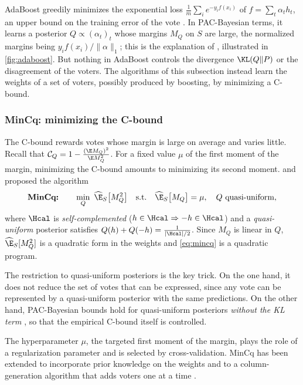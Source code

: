 AdaBoost greedily minimizes the exponential loss $\frac1m\sum_ie^{-y_if(x_i)}$
of $f=\sum_t\alpha_th_t$, an upper bound on the training error of the vote
\citep{freund1997decision}. In PAC-Bayesian terms, it learns a posterior
$Q\propto(\alpha_t)_t$ whose margins $M_Q$ on $S$ are large, the normalized
margins being $y_if(x_i)/\|\alpha\|_1$; this is the explanation of
\citet{schapire1998boosting}, illustrated in \cref{fig:adaboost}. But nothing in
AdaBoost controls the divergence $\KL(Q\|P)$ or the disagreement of the voters.
The algorithms of this subsection instead learn the weights of a set of voters,
possibly produced by boosting, by minimizing a C-bound.

\subsubsection{MinCq: minimizing the C-bound}

The C-bound rewards votes whose margin is large on average and varies little.
Recall that $\mathcal C_Q=1-\frac{(\E M_Q)^2}{\E M_Q^2}$. For a fixed value $\mu$ of the
first moment of the margin, minimizing the C-bound amounts to minimizing its
second moment. \citet{laviolette2011from} and \citet{germain2015risk} proposed
the algorithm
\begin{equation}\label{eq:mincq}
\textbf{MinCq:}\qquad \min_{Q}\ \widehat{\E}_S\big[M_Q^2\big]\quad\text{s.t.}\quad\widehat{\E}_S\big[M_Q\big]=\mu,\quad Q\text{ quasi-uniform},
\end{equation}
where $\Hcal$ is \emph{self-complemented} ($h\in\Hcal\Rightarrow-h\in\Hcal$) and a
\emph{quasi-uniform} posterior satisfies $Q(h)+Q(-h)=\frac1{|\Hcal|/2}$. Since
$M_Q$ is linear in $Q$, $\widehat\E_S[M_Q^2]$ is a quadratic form in the weights
and \eqref{eq:mincq} is a quadratic program.

The restriction to quasi-uniform posteriors is the key trick. On the one hand, it does not reduce the set of
votes that can be expressed, since any vote can be represented by a
quasi-uniform posterior with the same predictions. On the other hand,
PAC-Bayesian bounds hold for quasi-uniform posteriors \emph{without the KL term}
\citep{germain2015risk}, so that the empirical C-bound itself is controlled.

The hyperparameter $\mu$, the targeted first moment of the margin, plays the role of
a regularization parameter and is selected by cross-validation. MinCq has been
extended to incorporate prior knowledge on the weights
\citep[P-MinCq,][]{bellet2014learning} and to a column-generation algorithm that
adds voters one at a time \citep[CqBoost,][]{roy2016column}.

